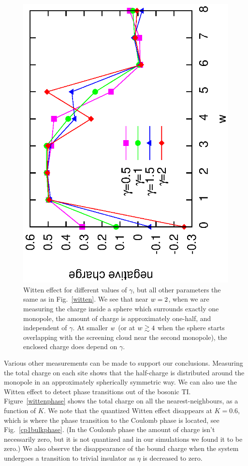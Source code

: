 \begin{figure}
\includegraphics[angle=-90,width=0.6\linewidth]{figures/wittendiff.eps}
\caption{Witten effect for different values of $\gamma$, but all other parameters the same as in Fig.~\ref{witten}. We see that near $\scripty{r}=2$, when we are measuring the charge inside a sphere which surrounds exactly one monopole, the amount of charge is approximately one-half, and independent of $\gamma$. At smaller $\scripty{r}$ (or at $\scripty{r} \gtrsim 4$ when the sphere starts overlapping with the screening cloud near the second monopole), the enclosed charge does depend on $\gamma$.}
\label{diffgamma}
\end{figure}

Various other measurements can be made to support our conclusions. Measuring the total charge on each site shows that the half-charge is distributed around the monopole in an approximately spherically symmetric way. We can also use the Witten effect to detect phase transitions out of the bosonic TI. Figure~\ref{wittenphase} shows the total charge on all the nearest-neighbours, as a function of $K$. We note that the quantized Witten effect disappears at $K=0.6$, which is where the phase transition to the Coulomb phase is located, see Fig.~\ref{cp1bulkphase}. (In the Coulomb phase the amount of charge isn't necessarily zero, but it is not quantized and in our simulations we found it to be zero.) We also observe the disappearance of the bound charge when the system undergoes a transition to trivial insulator as $\eta$ is decreased to zero.


